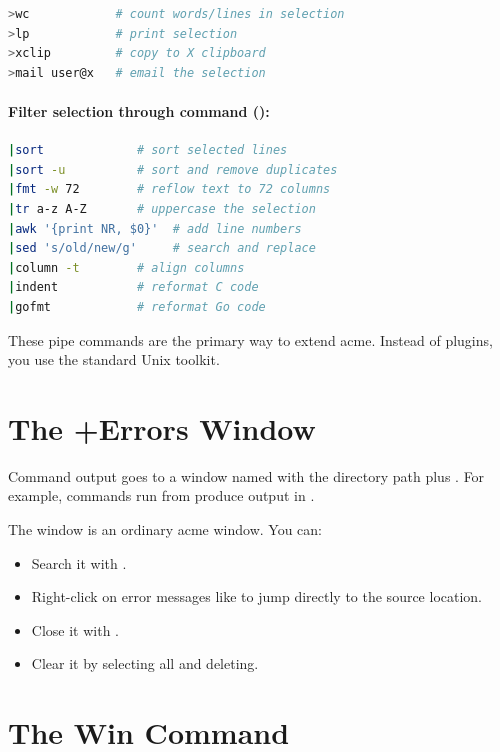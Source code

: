 \begin{lstlisting}[language=bash]
>wc            # count words/lines in selection
>lp            # print selection
>xclip         # copy to X clipboard
>mail user@x   # email the selection
\end{lstlisting}

\paragraph{Filter selection through command (\texttt{\textbar}):}

\begin{lstlisting}[language=bash]
|sort             # sort selected lines
|sort -u          # sort and remove duplicates
|fmt -w 72        # reflow text to 72 columns
|tr a-z A-Z       # uppercase the selection
|awk '{print NR, $0}'  # add line numbers
|sed 's/old/new/g'     # search and replace
|column -t        # align columns
|indent           # reformat C code
|gofmt            # reformat Go code
\end{lstlisting}

These pipe commands are the primary way to extend acme.  Instead of
plugins, you use the standard Unix toolkit.

\section{The +Errors Window}
\label{sec:errors}


Command output goes to a window named with the directory path plus
.  For example, commands run from
 produce output in
.

The  window is an ordinary acme window.  You can:

\begin{itemize}
\item Search it with .
\item Right-click on error messages like  to
      jump directly to the source location.
\item Close it with .
\item Clear it by selecting all and deleting.
\end{itemize}

\section{The Win Command}
\label{sec:win}

